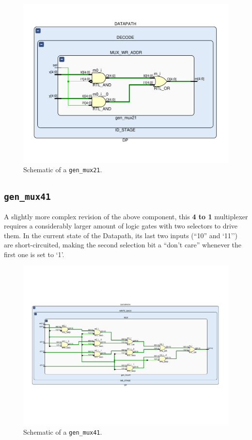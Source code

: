 \begin{figure}[!ht]
\centering
\includegraphics[width=\textwidth]{./chapters/figures/gen_mux21.pdf} 
\caption{Schematic of a \texttt{gen\_mux21}.}
\end{figure}

\subsection{\texttt{gen\_mux41}}
\label{4to1}
A slightly more complex revision of the above component, this \textbf{4 to 1} multiplexer requires a considerably larger amount of logic gates with two selectors to drive them. In the current state of the Datapath, its last two inputs (``10'' and `11'') are short-circuited, making the second selection bit a ``don't care'' whenever the first one is set to `1'.

\begin{figure}[!ht]
\centering
\includegraphics[width=\textwidth]{./chapters/figures/gen_mux41.pdf} 
\caption{Schematic of a \texttt{gen\_mux41}.}
\end{figure}

